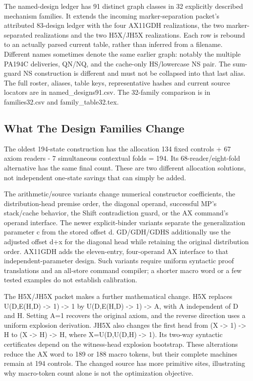 The named-design ledger has 91 distinct graph classes in 32 explicitly described mechanism families. It extends the incoming marker-separation packet's attributed 83-design ledger with the four AX11GDH realizations, the two marker-separated realizations and the two H5X/JH5X realizations. Each row is rebound to an actually parsed current table, rather than inferred from a filename. Different names sometimes denote the same earlier graph: notably the multiple PA194C deliveries, QN/NQ, and the cache-only HS/lowercase NS pair. The sum-guard NS construction is different and must not be collapsed into that last alias. The full roster, aliases, table keys, representative hashes and current source locators are in named\_designs91.csv. The 32-family comparison is in families32.csv and family\_table32.tex.

\subsection{What The Design Families Change}

The oldest 194-state construction has the allocation 134 fixed controls + 67 axiom readers - 7 simultaneous contextual folds = 194. Its 68-reader/eight-fold alternative has the same final count. These are two different allocation solutions, not independent one-state savings that can simply be added.

The arithmetic/source variants change numerical constructor coefficients, the distribution-head premise order, the diagonal operand, successful MP's stack/cache behavior, the Shift contradiction guard, or the AX command's operand interface. The newer explicit-binder variants separate the generalization parameter c from the stored offset d. GD/GDH/GDHS additionally use the adjusted offset d+x for the diagonal head while retaining the original distribution order. AX11GDH adds the eleven-entry, four-operand AX interface to that independent-parameter design. Such variants require uniform syntactic proof translations and an all-store command compiler; a shorter macro word or a few tested examples do not establish calibration.

The H5X/JH5X packet makes a further mathematical change. H5X replaces U(D,E(H,D) -> 1) -> 1 by U(D,E(H,D) -> 1) -> A, with A independent of D and H. Setting A=1 recovers the original axiom, and the reverse direction uses a uniform explosion derivation. JH5X also changes the first head from (X -> 1) -> H to (X -> H) -> H, where X=U(D,U(D,H) -> 1). Its two-way syntactic certificates depend on the witness-head explosion bootstrap. These alterations reduce the AX word to 189 or 188 macro tokens, but their complete machines remain at 194 controls. The changed source has more primitive sites, illustrating why macro-token count alone is not the optimization objective.

